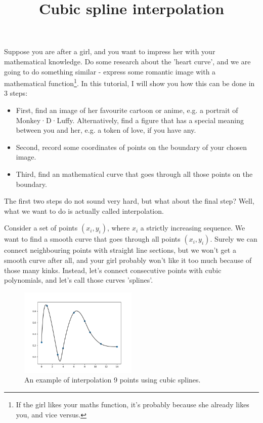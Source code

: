 \documentclass[paper=a4,fontsize=11pt]{scrartcl} %
\title{Cubic spline interpolation}
\begin{document}
\maketitle
Suppose you are after a girl, and you want to impress her with your mathematical knowledge. Do some research about the 'heart curve', and we are going to do something similar - express some romantic image with a mathematical function\footnote{If the girl likes your maths function, it's probably because she already likes you, and vice versus.}. In this tutorial, I will show you how this can be done in 3 steps:

\begin{itemize}
  \item First, find an image of her favourite cartoon or anime, e.g. a portrait of Monkey·D·Luffy. Alternatively, find a figure that has a special meaning between you and her, e.g. a token of love, if you have any.
  \item Second, record some coordinates of points on the boundary of your chosen image.
  \item Third, find an mathematical curve that goes through all those points on the boundary.
\end{itemize}

The first two steps do not sound very hard, but what about the final step? Well, what we want to do is actually called interpolation. 

Consider a set of points $(x_i, y_i)$, where $x_i$ a strictly increasing sequence. We want to find a smooth curve that goes through all points $(x_i, y_i)$. Surely we can connect neighbouring points with straight line sections, but we won't get a smooth curve after all, and your girl probably won't like it too much because of those many kinks. Instead, let's connect consecutive points with cubic polynomials, and let's call those curves 'splines'.

\begin{figure}[h!]
  \centering
  \includegraphics[width=0.5\textwidth]{image/random_interpolation.png}
  \caption{An example of interpolation 9 points using cubic splines.}
  \label{fig:random_interpolation}
\end{figure}
\end{document}
